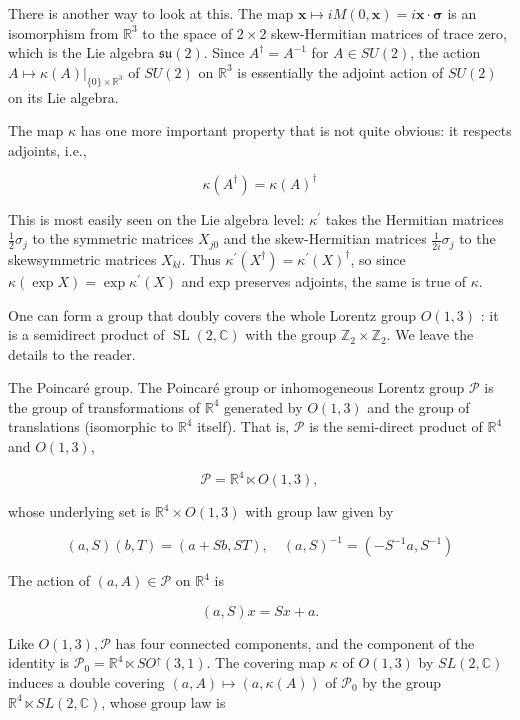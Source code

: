 \documentclass[10pt, letterpaper]{article}
\begin{document}
There is another way to look at this. The map $\mathbf{x} \mapsto i M(0, \mathbf{x})=i \mathbf{x} \cdot \boldsymbol{\sigma}$ is an isomorphism from $\mathbb{R}^{3}$ to the space of $2 \times 2$ skew-Hermitian matrices of trace zero, which is the Lie algebra $\mathfrak{s u}(2)$. Since $A^{\dagger}=A^{-1}$ for $A \in S U(2)$, the action\\
$\left.A \mapsto \kappa(A)\right|_{\{0\} \times \mathbb{R}^{3}}$ of $S U(2)$ on $\mathbb{R}^{3}$ is essentially the adjoint action of $S U(2)$ on its Lie algebra.

The map $\kappa$ has one more important property that is not quite obvious: it respects adjoints, i.e.,

$$
\kappa\left(A^{\dagger}\right)=\kappa(A)^{\dagger}
$$

This is most easily seen on the Lie algebra level: $\kappa^{\prime}$ takes the Hermitian matrices $\frac{1}{2} \sigma_{j}$ to the symmetric matrices $X_{j 0}$ and the skew-Hermitian matrices $\frac{1}{2 i} \sigma_{j}$ to the skewsymmetric matrices $X_{k l}$. Thus $\kappa^{\prime}\left(X^{\dagger}\right)=\kappa^{\prime}(X)^{\dagger}$, so since $\kappa(\exp X)=\exp \kappa^{\prime}(X)$ and exp preserves adjoints, the same is true of $\kappa$.

One can form a group that doubly covers the whole Lorentz group $O(1,3)$ : it is a semidirect product of $\operatorname{SL}(2, \mathbb{C})$ with the group $\mathbb{Z}_{2} \times \mathbb{Z}_{2}$. We leave the details to the reader.

The Poincaré group. The Poincaré group or inhomogeneous Lorentz group $\mathcal{P}$ is the group of transformations of $\mathbb{R}^{4}$ generated by $O(1,3)$ and the group of translations (isomorphic to $\mathbb{R}^{4}$ itself). That is, $\mathcal{P}$ is the semi-direct product of $\mathbb{R}^{4}$ and $O(1,3)$,

$$
\mathcal{P}=\mathbb{R}^{4} \ltimes O(1,3),
$$

whose underlying set is $\mathbb{R}^{4} \times O(1,3)$ with group law given by

$$
(a, S)(b, T)=(a+S b, S T), \quad(a, S)^{-1}=\left(-S^{-1} a, S^{-1}\right)
$$

The action of $(a, A) \in \mathcal{P}$ on $\mathbb{R}^{4}$ is

$$
(a, S) x=S x+a .
$$

Like $O(1,3), \mathcal{P}$ has four connected components, and the component of the identity is $\mathcal{P}_{0}=\mathbb{R}^{4} \ltimes S O^{\uparrow}(3,1)$. The covering map $\kappa$ of $O(1,3)$ by $S L(2, \mathbb{C})$ induces a double covering $(a, A) \mapsto(a, \kappa(A))$ of $\mathcal{P}_{0}$ by the group $\mathbb{R}^{4} \ltimes S L(2, \mathbb{C})$, whose group law is
\end{document}
